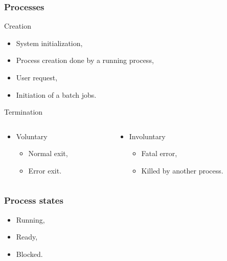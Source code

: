   \begin{frame}
    \frametitle{Processes}
        \begin{block}{Creation}
          \begin{itemize}
            \item System initialization,
            \item Process creation done by a running process,
            \item User request,
            \item Initiation of a batch jobs.
          \end{itemize}
        \end{block}

        \begin{block}{Termination}
          \begin{columns}[onlytextwidth]
            \begin{column}{0.4\textwidth}
              \begin{itemize}
                \item Voluntary
                \begin{itemize}
                  \item Normal exit,
                  \item Error exit.
                \end{itemize}
              \end{itemize}
            \end{column}
            \begin{column}{0.6\textwidth}
              \begin{itemize}
                \item Involuntary
                \begin{itemize}
                  \item Fatal error,
                  \item Killed by another process.
                \end{itemize}
              \end{itemize}
            \end{column}
          \end{columns}
        \end{block}
  \end{frame}

  \begin{frame}
    \frametitle{Process states}
        \begin{itemize}
          \item Running,
          \item Ready,
          \item Blocked.
        \end{itemize}
  \end{frame}

